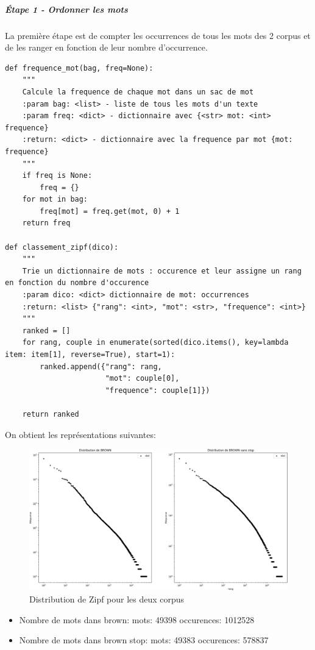		\subparagraph{Étape 1 - Ordonner les mots}
			La première étape est de compter les occurrences de tous les mots des 2 corpus et de les ranger en fonction de leur nombre d’occurrence. 
			\begin{lstlisting}[title=Triage des mots]
def frequence_mot(bag, freq=None):
    """
    Calcule la frequence de chaque mot dans un sac de mot
    :param bag: <list> - liste de tous les mots d'un texte
    :param freq: <dict> - dictionnaire avec {<str> mot: <int> frequence}
    :return: <dict> - dictionnaire avec la frequence par mot {mot: frequence}
    """
    if freq is None:
        freq = {}
    for mot in bag:
        freq[mot] = freq.get(mot, 0) + 1
    return freq

def classement_zipf(dico):
    """
    Trie un dictionnaire de mots : occurence et leur assigne un rang en fonction du nombre d'occurence
    :param dico: <dict> dictionnaire de mot: occurrences
    :return: <list> {"rang": <int>, "mot": <str>, "frequence": <int>}
    """
    ranked = []
    for rang, couple in enumerate(sorted(dico.items(), key=lambda item: item[1], reverse=True), start=1):
        ranked.append({"rang": rang,
                       "mot": couple[0],
                       "frequence": couple[1]})

    return ranked \end{lstlisting}


    		On obtient les représentations suivantes: 
		\begin{figure}[H]
				\includegraphics[width=\linewidth]{img/distribZipf.png}
				\caption{Distribution de Zipf pour les deux corpus}
		\end{figure}    		

    		\begin{itemize}
    			\item Nombre de mots dans brown:	mots: 49398	occurences: 1012528
    			\item Nombre de mots dans brown stop:	mots: 49383	occurences: 578837\\
    		\end{itemize}


